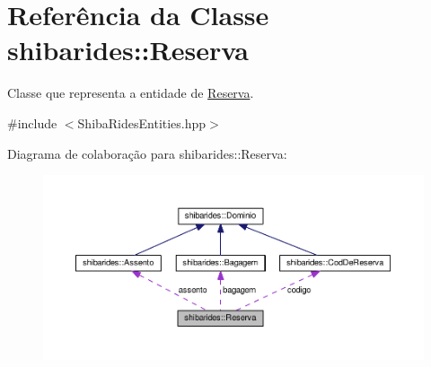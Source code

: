 \hypertarget{classshibarides_1_1Reserva}{}\section{Referência da Classe shibarides\+:\+:Reserva}
\label{classshibarides_1_1Reserva}


Classe que representa a entidade de \hyperlink{classshibarides_1_1Reserva}{Reserva}.  




{\ttfamily \#include $<$Shiba\+Rides\+Entities.\+hpp$>$}



Diagrama de colaboração para shibarides\+:\+:Reserva\+:\nopagebreak
\begin{figure}[H]
\begin{center}
\leavevmode
\includegraphics[width=350pt]{classshibarides_1_1Reserva__coll__graph}
\end{center}
\end{figure}
